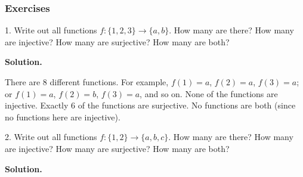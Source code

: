 \documentclass[10pt,]{book}
\theoremstyle{plain}
\theoremstyle{definition}
\theoremstyle{definition}
\theoremstyle{definition}
\begin{document}
\subsubsection[Exercises]{Exercises}\label{exercises-3}
\begin{exerciselist}
\item[1.]\hypertarget{exercise-27}{}
            Write out all functions \(f: \{1,2,3\} \to \{a,b\}\). How many are there? How many are injective? How many are surjective? How many are both?
\par\smallskip
\par\smallskip
\noindent\textbf{Solution.}\hypertarget{solution-45}{}\quad

            There are 8 different functions. For example, \(f(1) = a\), \(f(2) = a\), \(f(3) = a\); or \(f(1) = a\), \(f(2) = b\), \(f(3) = a\), and so on. None of the functions are injective. Exactly 6 of the functions are surjective. No functions are both (since no functions here are injective).
\item[2.]\hypertarget{exercise-28}{}
            Write out all functions \(f: \{1,2\} \to \{a,b,c\}\). How many are there? How many are injective? How many are surjective? How many are both?
\par\smallskip
\par\smallskip
\noindent\textbf{Solution.}\hypertarget{solution-46}{}\quad


\end{exerciselist}
\end{document}
